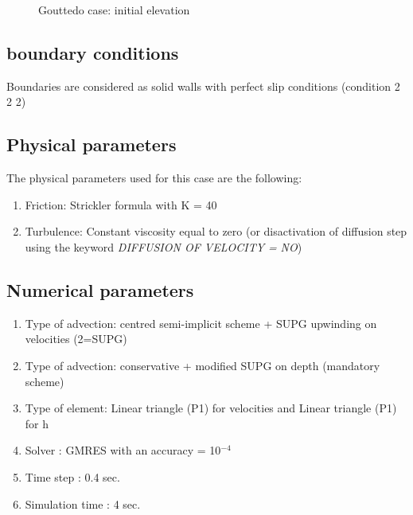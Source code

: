 \begin{figure}[H]
\begin{center}
\end{center}
\caption{Gouttedo case: initial elevation}
\label{fig:gouttedo_init}
\end{figure}

\subsection{boundary conditions}
Boundaries are considered as solid walls with perfect slip conditions (condition 2 2 2)

%
%
%

%
%
\subsection{Physical parameters}
%
The physical parameters used for this case are the following:
\begin{enumerate}
\item Friction: Strickler formula with K = 40
\item Turbulence: Constant viscosity equal to zero (or disactivation of
  diffusion step using the keyword  \textit{DIFFUSION OF VELOCITY =}\textit{
  NO})
\end{enumerate}

\subsection{Numerical parameters}
\begin{enumerate}
\item Type of advection: centred semi-implicit scheme + SUPG upwinding on
  velocities (2=SUPG)
\item Type of advection:  conservative + modified SUPG on depth (mandatory
  scheme)
\item  Type of element: Linear triangle (P1) for velocities and  Linear
  triangle (P1) for h
\item Solver : GMRES with an accuracy =  10${}^{-4}$
\item Time step : 0.4 sec.
\item Simulation time : 4 sec.
\end{enumerate}
%
%

